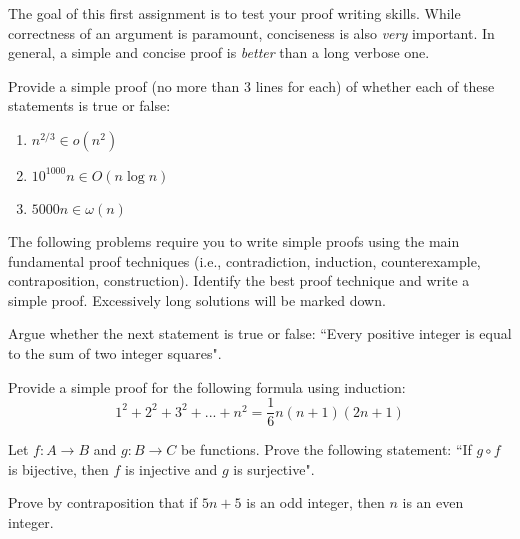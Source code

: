 \documentclass{common/cs157}
\begin{document}
\homeworkhandin 

The goal of this first assignment is to test your proof writing skills. While correctness of an argument is paramount, conciseness is also \emph{very} important. In general, a simple and concise proof is \emph{better} than a long verbose one. 

\begin{problem}{1}
Provide a simple proof (no more than 3 lines for each) of whether each of these statements is true or false:
\begin{enumerate}
    \item $n^{2/3} \in o(n^2)$
    \item $10^{1000}n \in O(n\log n)$
    \item $5000n \in \omega(n)$
\end{enumerate}
\end{problem}

The following problems require you to write simple proofs using the main fundamental proof techniques (i.e., contradiction, induction, counterexample, contraposition, construction). Identify the best proof technique and write a simple proof. Excessively long solutions will be marked down.

\begin{problem}{2}
Argue whether the next statement is true or false: ``Every positive integer is equal to the sum of two integer squares".
\end{problem}

\begin{problem}{3}
Provide a simple proof for the following formula using induction:
\begin{equation*}
    1^2 + 2^2 + 3^2 + . . . + n^2 = \frac{1}{6}n(n + 1)(2n + 1)
\end{equation*}
\end{problem}

\begin{problem}{4}
Let $f : A \longrightarrow B$ and $g : B \longrightarrow C$ be functions. Prove the following statement: ``If $g \circ f$ is bijective, then $f$ is injective and $g$ is surjective".
\end{problem}

\begin{problem}{5}
Prove by contraposition that if $5n + 5$ is an odd integer, then $n$ is an even integer.
\end{problem}
\end{document}

